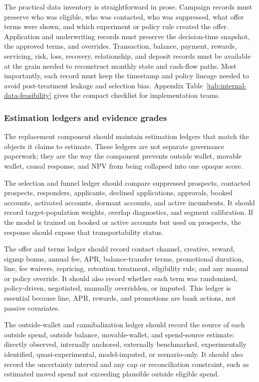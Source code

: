 \documentclass[11pt]{article}
\newcommand{\1}{\mathbf{1}}
\begin{document}
The practical data inventory is straightforward in prose.  Campaign records
must preserve who was eligible, who was contacted, who was suppressed, what
offer terms were shown, and which experiment or policy rule created the offer.
Application and underwriting records must preserve the decision-time snapshot,
the approved terms, and overrides.  Transaction, balance, payment, rewards,
servicing, risk, loss, recovery, relationship, and deposit records must be
available at the grain needed to reconstruct monthly state and cash-flow paths.
Most importantly, each record must keep the timestamp and policy lineage needed
to avoid post-treatment leakage and selection bias.  Appendix
Table~\ref{tab:internal-data-feasibility} gives the compact checklist for
implementation teams.

\subsubsection{Estimation ledgers and evidence grades}

The replacement component should maintain estimation ledgers that match the
objects it claims to estimate. These ledgers are not separate governance
paperwork; they are the way the component prevents outside wallet, movable
wallet, causal response, and NPV from being collapsed into one opaque score.

The selection and funnel ledger should compare suppressed prospects,
contacted prospects, responders, applicants, declined applications, approvals,
booked accounts, activated accounts, dormant accounts, and active incumbents.
It should record target-population weights, overlap diagnostics, and segment
calibration. If the model is trained on booked or active accounts but used on
prospects, the response should expose that transportability status.

The offer and terms ledger should record contact channel, creative, reward,
signup bonus, annual fee, APR, balance-transfer terms, promotional duration,
line, fee waivers, repricing, retention treatment, eligibility rule, and any
manual or policy override. It should also record whether each term was
randomized, policy-driven, negotiated, manually overridden, or imputed. This
ledger is essential because line, APR, rewards, and promotions are bank
actions, not passive covariates.

The outside-wallet and cannibalization ledger should record the source of each
outside spend, outside balance, movable-wallet, and spend-source estimate:
directly observed, internally anchored, externally benchmarked,
experimentally identified, quasi-experimental, model-imputed, or scenario-only.
It should also record the uncertainty interval and any cap or reconciliation
constraint, such as estimated moved spend not exceeding plausible outside
eligible spend.
\end{document}
